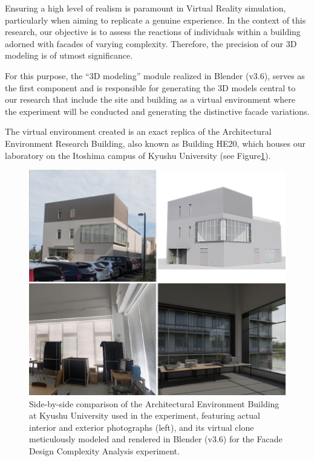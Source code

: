 %    

Ensuring a high level of realism is paramount in Virtual Reality simulation, particularly when aiming to replicate a genuine experience.
In the context of this research, our objective is to assess the reactions of individuals within a building adorned with facades of varying complexity.
Therefore, the precision of our 3D modeling is of utmost significance.

For this purpose, the ``3D modeling'' module realized in Blender (v3.6), serves as the first component and is responsible for generating the 3D models central to our research that include the site and building as a virtual environment where the experiment will be conducted and generating the distinctive facade variations.

The virtual environment created is an exact replica of the Architectural Environment Research Building, also known as Building HE20, which houses our laboratory on the Itoshima campus of Kyushu University (see Figure\ref{fig:RealVs3dModel}).

     \begin{figure}[t]
          \centering
          \includegraphics[width= \linewidth]{Images/Realvs3DmodelBlender}
          \caption{Side-by-side comparison of the Architectural Environment Building at Kyushu University used in the experiment, featuring actual interior and exterior photographs (left), and its virtual clone meticulously modeled and rendered in Blender (v3.6) for the Facade Design Complexity Analysis experiment.}
          \label{fig:RealVs3dModel}
        \end{figure}

